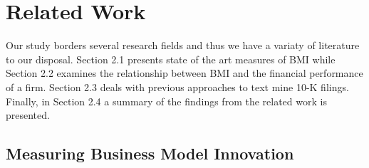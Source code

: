 \documentclass[manuscript,screen,review]{acmart}
\begin{document}
\section{Related Work}\label{related-work}

Our study borders several research fields and thus we have a variaty of
literature to our disposal. Section 2.1 presents state of the art
measures of BMI while Section 2.2 examines the relationship between BMI
and the financial performance of a firm. Section 2.3 deals with previous
approaches to text mine 10-K filings. Finally, in Section 2.4 a summary
of the findings from the related work is presented.

\subsection{Measuring Business Model
Innovation}\label{measuring-business-model-innovation}
\end{document}
